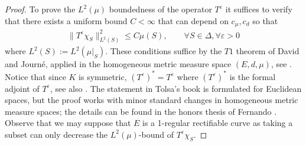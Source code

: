 \documentclass[11pt]{amsart}
\theoremstyle{definition}
\newcommand{\ve}{\varepsilon}
\numberwithin{theorem}{section} \numberwithin{equation}{section}
\begin{document}
\begin{proof}
To prove the $L^{2}(\mu)$ boundedness of the operator $T^{\ve}$  it suffices to verify that there exists a uniform bound $C < \infty$ that can depend on $c_{\mu}, c_d$ so that
\begin{align}
  \|T^\ve \chi_S\|_{L^2(S)}^2 \leq C \mu(S), \qquad \forall S \in \Delta, \forall \ve > 0 \label{e:T_eps-bound}
\end{align}
where $L^2(S):=L^2(\mu|_S)$. These conditions suffice by the $T1$ theorem of David and Journ\'e, applied in the homogeneous metric measure space $(E,d,\mu)$, see \cite[Theorem 3.21]{tolsabook}. Notice that since $K$ is symmetric, $(T^{\ve})^{\ast}=T^{\ve}$ where $(T^{\ve})^{\ast}$ is the formal adjoint of $T^{\ve}$, see also \cite[Remark 2.6]{CFOsios}. The statement in Tolsa's book is formulated for Euclidean spaces, but the proof works with minor standard changes in homogeneous metric measure spaces; the details can be found in the honors thesis of Fernando \cite{Fer}. Observe that we may suppose that $E$ is a 1-regular rectifiable curve as taking a subset can only decrease the $L^2(\mu)$-bound of $T^\ve \chi_S$.


\end{proof}
\end{document}
